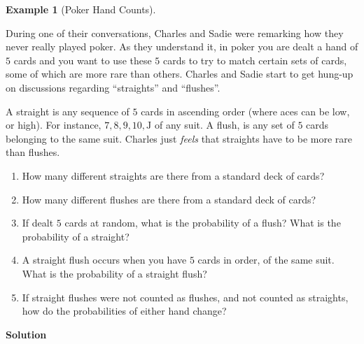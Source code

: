 \documentclass[
  letterpaper,
  DIV=11,
  numbers=noendperiod]{scrreprt}
\providecommand{\tightlist}{%
  \setlength{\itemsep}{0pt}\setlength{\parskip}{0pt}}\usepackage{longtable,booktabs,array}
\theoremstyle{definition}
\theoremstyle{definition}
\newtheorem{example}{Example}[chapter]
\theoremstyle{definition}
\theoremstyle{remark}
\begin{document}
\begin{example}[Poker Hand
Counts]\protect\hypertarget{exm-poker-hands}{}\label{exm-poker-hands}

During one of their conversations, Charles and Sadie were remarking how
they never really played poker. As they understand it, in poker you are
dealt a hand of \(5\) cards and you want to use these \(5\) cards to try
to match certain sets of cards, some of which are more rare than others.
Charles and Sadie start to get hung-up on discussions regarding
``straights'' and ``flushes''.

A straight is any sequence of \(5\) cards in ascending order (where aces
can be low, or high). For instance, \(7, 8, 9, 10, \text{J}\) of any
suit. A flush, is any set of \(5\) cards belonging to the same suit.
Charles just \emph{feels} that straights have to be more rare than
flushes.

\begin{enumerate}
\def\labelenumi{\alph{enumi}.}
\tightlist
\item
  How many different straights are there from a standard deck of cards?
\item
  How many different flushes are there from a standard deck of cards?
\item
  If dealt \(5\) cards at random, what is the probability of a flush?
  What is the probability of a straight?
\item
  A straight flush occurs when you have \(5\) cards in order, of the
  same suit. What is the probability of a straight flush?
\item
  If straight flushes were not counted as flushes, and not counted as
  straights, how do the probabilities of either hand change?
\end{enumerate}

\begin{tcolorbox}[enhanced jigsaw, colback=white, colframe=quarto-callout-color-frame, arc=.35mm, leftrule=.75mm, rightrule=.15mm, opacityback=0, breakable, bottomrule=.15mm, left=2mm, toprule=.15mm]

\vspace{-3mm}\textbf{Solution}\vspace{3mm}


\end{tcolorbox}
\end{example}
\end{document}

